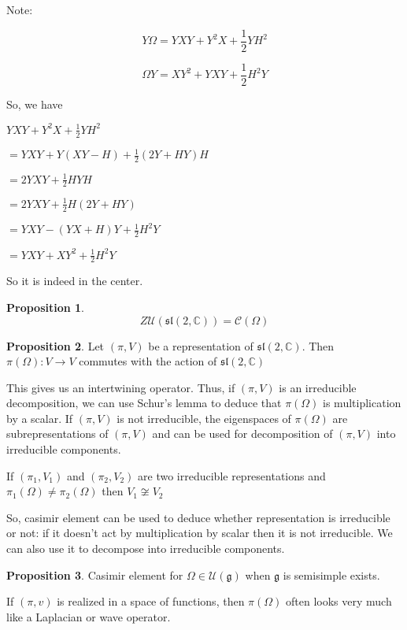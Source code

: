 \documentclass{article}
\theoremstyle{definition}
\newtheorem{proposition}{Proposition}
\begin{document}
Note:

\[
    Y \Omega = YXY + Y^2 X + \frac{1}{2} YH^2
\]

\[
    \Omega Y = XY^2 + YXY + \frac{1}{2} H^2 Y
\]

So, we have

\(YXY + Y^2 X + \frac{1}{2} YH^2\) 

\(= YXY + Y(XY - H) + \frac{1}{2} (2Y+HY)H\)

\(=2YXY + \frac{1}{2} HYH\)

\(=2YXY + \frac{1}{2} H(2Y+HY)\)

\(= YXY - (YX+H)Y + \frac{1}{2} H^2 Y\)

\(= YXY + XY^2 + \frac{1}{2}H^2 Y\) 

So it is indeed in the center.

\begin{proposition}
    \[
        Z \mathcal{U} (\mathfrak{sl} (2,\mathbb{C})) = \mathcal{C} (\Omega)
    \]

\end{proposition}

\begin{proposition}
    Let \((\pi ,V)\) be a representation of \(\mathfrak{sl}(2,\mathbb{C}) \). Then \(\pi(\Omega):V\to V\) commutes with the action of \(\mathfrak{sl}(2,\mathbb{C}) \)  
\end{proposition}

This gives us an intertwining operator. Thus, if \((\pi,V)\) is an irreducible decomposition, we can use Schur's lemma to deduce that \(\pi(\Omega)\) is multiplication by a scalar. If \((\pi ,V)\) is not irreducible, the eigenspaces of \(\pi(\Omega)\) are subrepresentations of \((\pi,V)\) and can be used for decomposition of \((\pi,V)\) into irreducible components.

If \((\pi_1,V_1)\) and \((\pi_2,V_2)\) are two irreducible representations and \(\pi_1(\Omega )\neq \pi_2(\Omega)\) then \(V_1\not\cong V_2\) 

So, casimir element can be used to deduce whether representation is irreducible or not: if it doesn't act by multiplication by scalar then it is not irreducible. We can also use it to decompose into irreducible components.

\begin{proposition}
    Casimir element for \(\Omega \in \mathcal{U} (\mathfrak{g} ) \) when \(\mathfrak{g} \) is semisimple exists. 
\end{proposition}

If \((\pi, v)\) is realized in a space of functions, then \(\pi(\Omega)\) often looks very much like a Laplacian or wave operator.
\end{document}
